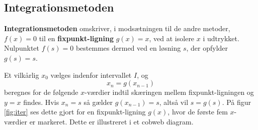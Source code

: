 \subsection*{Integrationsmetoden}
\textbf{Integrationsmetoden} omskriver, i modsætningen til de andre metoder, $f(x)=0$ til en \textbf{fixpunkt-ligning} $g(x)=x$, ved at isolere $x$ i udtrykket. Nulpunktet $f(s)=0$ bestemmes dermed ved en løsning $s$, der opfylder $g(s)=s$.

Et vilkårlig $x_0$ vælges indenfor intervallet $I$, og $$x_n=g(x_{n-1})$$
beregnes for de følgende $x$-værdier indtil skæringen mellem fixpunkt-ligningen og $y=x$ findes. 
Hvis $x_n=s$ så gælder $g(x_{n-1})=s$, altså vil $s=g(s)$.
På figur \ref{fig:iter} ses dette gjort for en fixpunkt-ligning $g(x)$, hvor de første fem $x$-værdier er markeret. Dette er illustreret i et cobweb diagram. 
%
%
